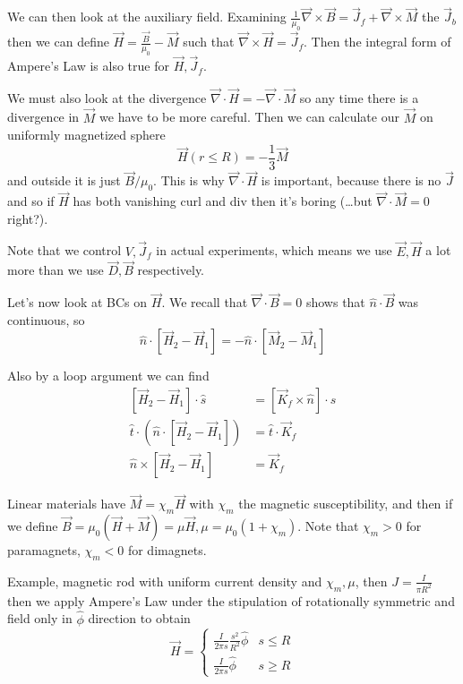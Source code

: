 \documentclass[10pt]{report}
\begin{document}
We can then look at the auxiliary field. Examining $\frac{1}{\mu_0}\vec{\nabla}\times \vec{B} = \vec{J}_f + \vec{\nabla}\times \vec{M}$ the $\vec{J}_b$ then we can define $\vec{H} = \frac{\vec{B}}{\mu_0} - \vec{M}$ such that $\vec{\nabla}\times \vec{H} = \vec{J}_f$. Then the integral form of Ampere's Law is also true for $\vec{H}, \vec{J}_f$. 

We must also look at the divergence $\vec{\nabla}\cdot \vec{H} = -\vec{\nabla}\cdot \vec{M}$ so any time there is a divergence in $\vec{M}$ we have to be more careful. Then we can calculate our $\vec{M}$ on uniformly magnetized sphere
\begin{equation}
    \vec{H}(r \leq R) = -\frac{1}{3}\vec{M}
\end{equation}
and outside it is just $\vec{B}/\mu_0$. This is why $\vec{\nabla}\cdot \vec{H}$ is important, because there is no $\vec{J}$ and so if $\vec{H}$ has both vanishing curl and div then it's boring (\dots but $\vec{\nabla} \cdot \vec{M} = 0$ right?).

Note that we control $V, \vec{J}_f$ in actual experiments, which means we use $\vec{E}, \vec{H}$ a lot more than we use $\vec{D}, \vec{B}$ respectively.

Let's now look at BCs on $\vec{H}$. We recall that $\vec{\nabla} \cdot \vec{B} = 0$ shows that $\hat{n}\cdot \vec{B}$ was continuous, so
\begin{equation}
    \hat{n}\cdot \left[ \vec{H}_2 - \vec{H}_1 \right] = -\hat{n}\cdot \left[ \vec{M}_2 - \vec{M}_1 \right]
\end{equation}

Also by a loop argument we can find
\begin{align}
    \left[ \vec{H}_2 - \vec{H}_1 \right]\cdot\hat{s} &= [\vec{K}_f \times\hat{n}]\cdot \hat{s}\\
    \hat{t}\cdot\left( \hat{n}\cdot \left[ \vec{H}_2 - \vec{H}_1 \right] \right) &= \hat{t}\cdot \vec{K}_f\\
    \hat{n} \times \left[ \vec{H}_2 - \vec{H}_1 \right] &= \vec{K}_f
\end{align}

Linear materials have $\vec{M} = \chi_m \vec{H}$ with $\chi_m$ the magnetic susceptibility, and then if we define $\vec{B} = \mu_0\left( \vec{H} + \vec{M} \right) = \mu \vec{H}, \mu = \mu_0(1 + \chi_m)$. Note that $\chi_m > 0$ for paramagnets, $\chi_m < 0$ for dimagnets.

Example, magnetic rod with uniform current density and $\chi_m, \mu$, then $J = \frac{I}{\pi R^2}$ then we apply Ampere's Law under the stipulation of rotationally symmetric and field only in $\hat{\phi}$ direction to obtain
\begin{equation}
    \vec{H} =
    \begin{cases}
        \frac{I}{2\pi s}\frac{s^2}{R^2}\hat{\phi} & s \leq R\\[10pt]
        \frac{I}{2\pi s}\hat{\phi} & s \geq R
    \end{cases}
\end{equation}
\end{document}
